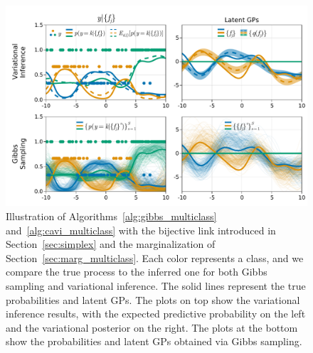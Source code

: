\begin{figure}[H]
    \centering
    \includegraphics[width=\textwidth]{./chapters/8_discussions/figures/categorical_bijective.pdf}
    \caption{Illustration of Algorithms~\ref{alg:gibbs_multiclass} and~\ref{alg:cavi_multiclass} with the bijective link introduced in Section~\ref{sec:simplex} and the marginalization of Section~\ref{sec:marg_multiclass}.
    Each color represents a class, and we compare the true process to the inferred one for both Gibbs sampling and variational inference.
    The solid lines represent the true probabilities and latent \ac{GPs}.
    The plots on top show the variational inference results, with the expected predictive probability on the left and the variational posterior on the right.
    The plots at the bottom show the probabilities and latent GPs obtained via Gibbs sampling.}
    \label{fig:bijective_multiclass}
\end{figure}
